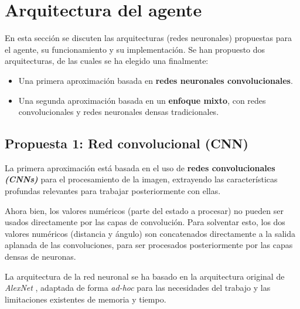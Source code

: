 \newpage

\section{Arquitectura del agente}

En esta sección se discuten las arquitecturas (redes neuronales) propuestas para el agente, su funcionamiento y su implementación. Se han propuesto dos arquitecturas, de las cuales se ha elegido una finalmente:

\begin{itemize}
		\item Una primera aproximación basada en \textbf{redes neuronales convolucionales}.
		\item Una segunda aproximación basada en un \textbf{enfoque mixto}, con redes convolucionales y redes neuronales densas tradicionales.
\end{itemize}

\subsection{Propuesta 1: Red convolucional (CNN)}

La primera aproximación está basada en el uso de \textbf{redes convolucionales \textit{(CNNs)}} para el procesamiento de la imagen, extrayendo las características profundas relevantes para trabajar posteriormente con ellas. 

Ahora bien, los valores numéricos (parte del estado a procesar) no pueden ser usados directamente por las capas de convolución. Para solventar esto, los dos valores numéricos (distancia y ángulo) son concatenados directamente a la salida aplanada de las convoluciones, para ser procesados posteriormente por las capas densas de neuronas.

La arquitectura de la red neuronal se ha basado en la arquitectura original de \textit{AlexNet} \cite{Krizhevsky2012ImageNetCW}, adaptada de forma \textit{ad-hoc} para las necesidades del trabajo y las limitaciones existentes de memoria y tiempo.

